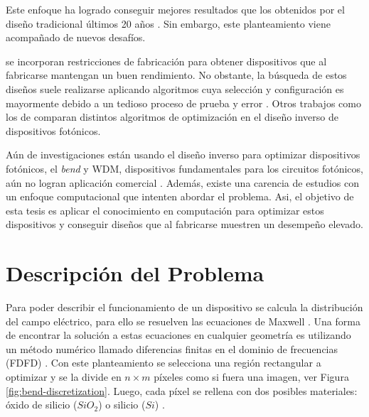 Este enfoque ha logrado conseguir mejores resultados que los obtenidos por el diseño tradicional \citep{Su2018, Molesky2018}  últimos 20 años \citep{Molesky2018} .
Sin embargo, este planteamiento viene acompañado de nuevos desafíos.

  \cite{Su2018, Piggott2017} se incorporan restricciones de fabricación para obtener dispositivos que al fabricarse mantengan un buen rendimiento. 
No obstante, la búsqueda de estos diseños suele realizarse aplicando algoritmos cuya selección y configuración es mayormente debido a un tedioso proceso de prueba y error .
Otros trabajos como los de \cite{Schneider2019, Elsawy2020, Gregory2015} comparan distintos algoritmos de optimización en el diseño inverso de dispositivos fotónicos. 


Aún  de investigaciones están usando el diseño inverso para optimizar dispositivos fotónicos, el \emph{bend} y WDM, dispositivos fundamentales para los circuitos fotónicos, aún no logran aplicación comercial \citep{Molesky2018}. 
Además, existe una carencia de estudios con un enfoque computacional que intenten abordar el problema. 
Asi,  el objetivo de esta tesis es aplicar el conocimiento en computación para optimizar estos dispositivos y conseguir diseños que al fabricarse muestren un desempeño elevado.


\section{Descripción del Problema}


Para poder describir el funcionamiento de un dispositivo se calcula la distribución del campo eléctrico, para ello se resuelven las ecuaciones
de Maxwell \citep{Schneider2019}. 
Una forma de encontrar la solución a estas ecuaciones en cualquier geometría es utilizando un método numérico llamado diferencias finitas en el dominio de frecuencias (FDFD) \citep{Su2020}.
Con este planteamiento se selecciona una región rectangular a optimizar y se la divide  en $n \times m$  píxeles como si fuera una imagen, ver Figura \ref{fig:bend-discretization}. 
Luego, cada píxel se rellena con dos posibles materiales: óxido de silicio ($SiO_2$) o silicio ($Si$) \citep{Molesky2018}.

